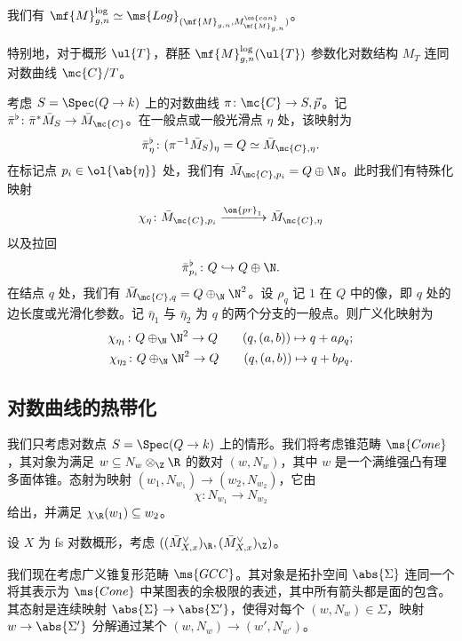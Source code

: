 \begin{prop}
    我们有 \(\mf{M}_{g,n}^{\log} \simeq \ms{Log}_{(\mf{M}_{g,n}, M_{\mf{M}_{g,n}}^{\on{can}})}\)。
\end{prop}

特别地，对于概形 \(\ul{T}\)，群胚 \(\mf{M}_{g,n}^{\log}(\ul{T})\) 参数化对数结构 \(M_T\) 连同对数曲线 \(\mc{C} / T\)。

考虑 \(S = \Spec (Q \to k)\) 上的对数曲线 \(\pi \colon \mc{C} \to S, \vec{p}\)。记 \(\bar{\pi}^{\flat} \colon \bar{\pi}^* \bar{M}_S \to \bar{M}_{\mc{C}}\)。在一般点或一般光滑点 \(\eta\) 处，该映射为
\[ \bar{\pi}_{\eta}^{\flat} \colon (\pi^{-1} \bar{M}_S)_{\eta} = Q \simeq \bar{M}_{\mc{C}, \eta}. \]
在标记点 \(p_i \in \ol{\ab\{\eta\}}\) 处，我们有 \(\bar{M}_{\mc{C}, p_i} = Q \oplus \N\)。此时我们有特殊化映射
\[ \chi_{\eta} \colon \bar{M}_{\mc{C}, p_i} \xrightarrow{\on{pr}_1} \bar{M}_{\mc{C}, \eta} \]
以及拉回
\[ \bar{\pi}_{p_i}^{\flat} \colon Q \hookrightarrow Q \oplus \N. \]
在结点 \(q\) 处，我们有 \(\bar{M}_{\mc{C}, q} = Q \oplus_{\N} \N^2\)。设 \(\rho_q\) 记 \(1\) 在 \(Q\) 中的像，即 \(q\) 处的边长度或光滑化参数。记 \(\bar{\eta}_1\) 与 \(\bar{\eta}_2\) 为 \(q\) 的两个分支的一般点。则广义化映射为
\begin{align*}
    \chi_{\eta_1} \colon Q \oplus_{\N} \N^2 \to Q \qquad (q, (a,b)) \mapsto q + a \rho_q ;\\
    \chi_{\eta_2} \colon Q \oplus_{\N} \N^2 \to Q \qquad (q, (a,b)) \mapsto q + b \rho_q .
\end{align*}

\subsection{对数曲线的热带化}%
\label{sub:Tropicalization of log curves}

我们只考虑对数点 \(S = \Spec(Q \to k)\) 上的情形。我们将考虑锥范畴 \(\ms{Cone}\)，其对象为满足 \(w \subseteq N_w \otimes_{\Z} \R\) 的数对 \((w, N_w)\)，其中 \(w\) 是一个满维强凸有理多面体锥。态射为映射 \((w_1, N_{w_1}) \to (w_2, N_{w_2})\)，它由
\[ \chi \colon N_{w_1} \to N_{w_2} \]
给出，并满足 \(\chi_{\R}(w_1) \subseteq w_2\)。

\begin{exm}
    设 \(X\) 为 fs 对数概形，考虑 \(( (\bar{M}_{X,x}^{\vee})_{\R}, (\bar{M}_{X,x}^{\vee})_{\Z} )\)。
\end{exm}

我们现在考虑广义锥复形范畴 \(\ms{GCC}\)。其对象是拓扑空间 \(\abs{\Sigma}\) 连同一个将其表示为 \(\ms{Cone}\) 中某图表的余极限的表述，其中所有箭头都是面的包含。其态射是连续映射 \(\abs{\Sigma} \to \abs{\Sigma'}\)，使得对每个 \((w, N_w) \in \Sigma\)，映射 \(w \to \abs{\Sigma'}\) 分解通过某个 \((w, N_w) \to (w', N_{w'})\)。

